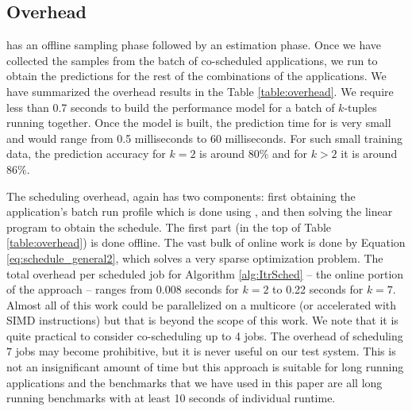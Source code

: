\subsection{Overhead}
\label{sec:expt:overhead}
\balance \SYSTEM{} has an offline sampling phase followed by an
estimation phase. Once we have collected the samples from the batch of
co-scheduled applications, we run \SYSTEM{} to obtain the predictions
for the rest of the combinations of the applications. We have
summarized the overhead results in the Table \ref{table:overhead}. We
require less than 0.7 seconds to build the performance model for a
batch of $k$-tuples running together. Once the model is built, the
prediction time for \SYSTEM{} is very small and would range from 0.5
milliseconds to 60 milliseconds. For such small training data, the
prediction accuracy for $k=2$ is around $80\%$ and for $k>2$ it is
around $86\%$.

The scheduling overhead, again has two components: first obtaining the
application's batch run profile which is done using \SYSTEM{}, and
then solving the linear program to obtain the schedule. The first part
(in the top of Table \ref{table:overhead}) is done offline.  The vast
bulk of online work is done by Equation \eqref{eq:schedule_general2},
which solves a very sparse optimization problem. The total overhead
per scheduled job for Algorithm \ref{alg:ItrSched} -- the online
portion of the approach -- ranges from 0.008 seconds for $k=2$ to 0.22
seconds for $k=7$. Almost all of this work could be parallelized on a
multicore (or accelerated with SIMD instructions) but that is beyond
the scope of this work.  We note that it is quite practical to
consider co-scheduling up to 4 jobs.  The overhead of scheduling $7$
jobs may become prohibitive, but it is never useful on our test
system.  This is not an insignificant amount of time but this approach
is suitable for long running applications and the benchmarks that we
have used in this paper are all long running benchmarks with at least
10 seconds of individual runtime.





